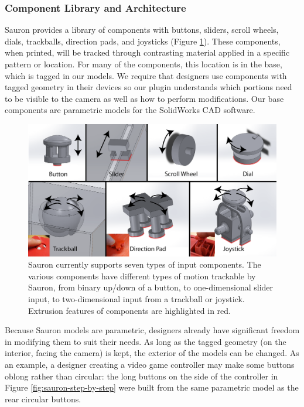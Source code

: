 \subsubsection{Component Library and Architecture }
Sauron provides a library of components with buttons, sliders, scroll wheels, dials, trackballs, direction pads, and joysticks (Figure \ref{fig:sauron-components}). These components, when printed, will be tracked through contrasting material applied in a specific pattern or location. For many of the components, this location is in the base, which is tagged in our models. We require that designers use components with tagged geometry in their devices so our plugin understands which portions need to be visible to the camera as well as how to perform modifications. Our base components are parametric models for the SolidWorks CAD software.

\begin{figure}
\centering
\includegraphics[width=\textwidth]{figures/sauron/sauron-inputs.png}
\caption{Sauron currently supports seven types of input components.  The various components have different types of motion trackable by Sauron, from binary up/down of a button, to one-dimensional slider input, to two-dimensional input from a trackball or joystick.  Extrusion features of components are highlighted in red.}
\label{fig:sauron-components}
\end{figure}

Because Sauron models are parametric, designers already have significant freedom in modifying them to suit their needs. As long as the tagged geometry (on the interior, facing the camera) is kept, the exterior of the models can be changed. As an example, a designer creating a video game controller may make some buttons oblong rather than circular: the long buttons on the side of the controller in Figure \ref{fig:sauron-step-by-step} were built from the same parametric model as the rear circular buttons.

